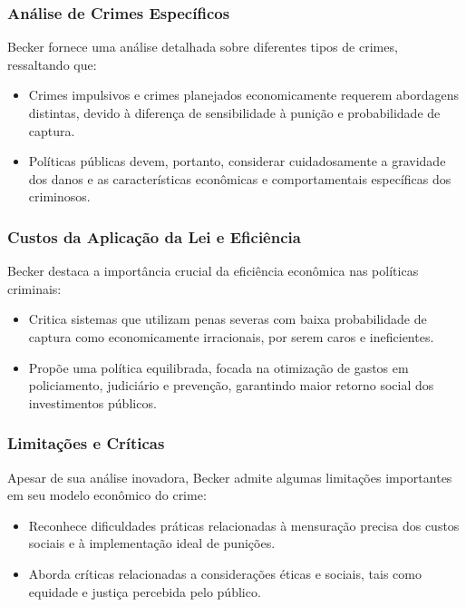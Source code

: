 \documentclass[a4paper,12pt]{article}[abntex2]
\begin{document}
\subsubsection{\textbf{Análise de Crimes Específicos}}

Becker fornece uma análise detalhada sobre diferentes tipos de crimes, ressaltando que:

\begin{itemize}
    \item Crimes impulsivos e crimes planejados economicamente requerem abordagens distintas, devido à diferença de sensibilidade à punição e probabilidade de captura.
    \item Políticas públicas devem, portanto, considerar cuidadosamente a gravidade dos danos e as características econômicas e comportamentais específicas dos criminosos.
\end{itemize}

\subsubsection{\textbf{Custos da Aplicação da Lei e Eficiência}}

Becker destaca a importância crucial da eficiência econômica nas políticas criminais:

\begin{itemize}
    \item Critica sistemas que utilizam penas severas com baixa probabilidade de captura como economicamente irracionais, por serem caros e ineficientes.
    \item Propõe uma política equilibrada, focada na otimização de gastos em policiamento, judiciário e prevenção, garantindo maior retorno social dos investimentos públicos.
\end{itemize}

\subsubsection{\textbf{Limitações e Críticas}}

Apesar de sua análise inovadora, Becker admite algumas limitações importantes em seu modelo econômico do crime:

\begin{itemize}
    \item Reconhece dificuldades práticas relacionadas à mensuração precisa dos custos sociais e à implementação ideal de punições.
    \item Aborda críticas relacionadas a considerações éticas e sociais, tais como equidade e justiça percebida pelo público.
\end{itemize}
\end{document}
